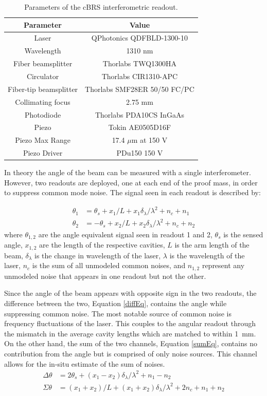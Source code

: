 \documentclass [12pt, proquest]{uwthesis}[2019]
\begin{document}
\begin{table}
\begin{center}
\bgroup
\def\arraystretch{1.5}
\begin{tabular}{| c | c |}
\hline
Parameter & Value\\
\hline \hline
Laser & QPhotonics QDFBLD-1300-10\\
Wavelength & 1310 nm\\
Fiber beamsplitter & Thorlabs TWQ1300HA\\
Circulator & Thorlabs CIR1310-APC\\
Fiber-tip beamsplitter & Thorlabs SMF28ER 50/50 FC/PC\\
Collimating focus & 2.75 mm\\
Photodiode & Thorlabs PDA10CS InGaAs\\
Piezo & Tokin AE0505D16F\\
Piezo Max Range & 17.4 $\mu$m at 150 V\\
Piezo Driver & PDu150 150 V\\
\hline
\end{tabular}
\caption{Parameters of the cBRS interferometric readout.}\label{cBRSTable}
\egroup
\end{center}
\end{table}

In theory the angle of the beam can be measured with a single interferometer. However, two readouts are deployed, one at each end of the proof mass, in order to suppress common mode noise. The signal seen in each readout is described by:

\begin{align}
\theta_1&=\theta_s+x_1/L+x_1 \delta_\lambda/\lambda^2+n_c+n_1 \label{th1} \\
\theta_2&=-\theta_s+x_2/L+x_2 \delta_\lambda/\lambda^2 + n_c+n_2 \label{th2}
\end{align}
where $\theta_{1,2}$ are the angle equivalent signal seen in readout 1 and 2, $\theta_{s}$ is the sensed angle, $x_{1,2}$ are the length of the respective cavities, $L$ is the arm length of the beam, $\delta_\lambda$ is the change in wavelength of the laser, $\lambda$ is the wavelength of the laser, $n_c$ is the sum of all unmodeled common noises, and $n_{1,2}$ represent any unmodeled noise that appears in one readout but not the other.

Since the angle of the beam appears with opposite sign in the two readouts, the difference between the two, Equation \ref{diffEq}, contains the angle while suppressing common noise. The most notable source of common noise is frequency fluctuations of the laser. This couples to the angular readout through the mismatch in the average cavity lengths which are matched to within 1~mm. On the other hand, the sum of the two channels, Equation \ref{sumEq}, contains no contribution from the angle but is comprised of only noise sources. This channel allows for the in-situ estimate of the sum of noises.
\begin{align}
\Delta \theta&=2\theta_s+ (x_1-x_2)\delta_\lambda/\lambda^2+n_1-n_2 \label{diffEq} \\
\Sigma \theta&=(x_1+x_2)/L+ (x_1+x_2)\delta_\lambda/\lambda^2+2n_c+n_1+n_2 \label{sumEq}
\end{align}
\end{document}
